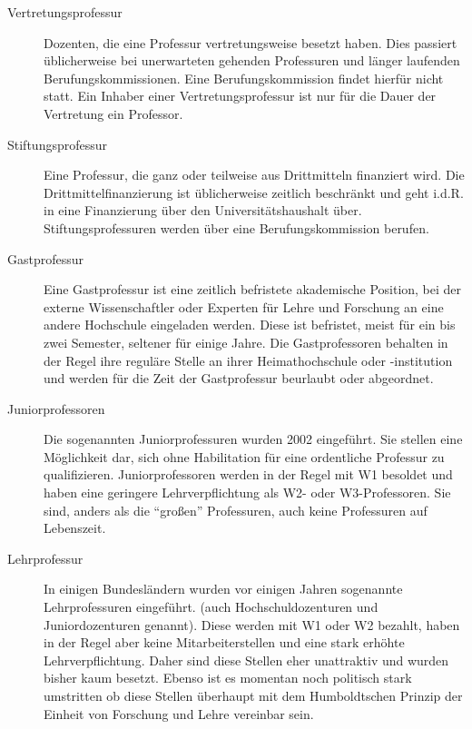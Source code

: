 \begin{description}
    \item [Vertretungsprofessur]
          Dozenten, die eine Professur vertretungsweise besetzt haben. Dies passiert üblicherweise bei unerwarteten gehenden Professuren und länger laufenden Berufungskommissionen.
          Eine Berufungskommission findet hierfür nicht statt.
          Ein Inhaber einer Vertretungsprofessur ist nur für die Dauer der Vertretung ein Professor.

    \item [Stiftungsprofessur]
          Eine Professur, die ganz oder teilweise aus Drittmitteln finanziert wird. Die Drittmittelfinanzierung ist üblicherweise zeitlich beschränkt und geht i.d.R. in eine Finanzierung über den Universitätshaushalt über.
          Stiftungsprofessuren werden über eine Berufungskommission berufen.

    \item [Gastprofessur]
          Eine Gastprofessur ist eine zeitlich befristete akademische Position, bei der externe Wissenschaftler oder Experten für Lehre und Forschung an eine andere Hochschule eingeladen werden. 
          Diese ist befristet, meist für ein bis zwei Semester, seltener für einige Jahre. Die Gastprofessoren behalten in der Regel ihre reguläre Stelle an ihrer Heimathochschule oder -institution und werden für die Zeit der Gastprofessur beurlaubt oder abgeordnet.

    \item [Juniorprofessoren]
          Die sogenannten Juniorprofessuren wurden 2002 eingeführt. Sie stellen eine Möglichkeit dar, sich
          ohne Habilitation für eine ordentliche Professur zu qualifizieren. Juniorprofessoren werden in der Regel mit W1
          besoldet und haben eine geringere Lehrverpflichtung als W2- oder W3-Professoren. Sie sind, anders als die "`großen"'
          Professuren, auch keine Professuren auf Lebenszeit.

    \item [Lehrprofessur]
          In einigen Bundesländern wurden vor einigen Jahren sogenannte Lehrprofessuren eingeführt.
          (auch Hochschuldozenturen und Juniordozenturen genannt). Diese werden mit W1 oder W2 bezahlt, haben
          in der Regel aber keine Mitarbeiterstellen und eine stark er\-höh\-te Lehrverpflichtung. Daher
          sind diese Stellen eher unattraktiv und wurden bisher kaum besetzt. Ebenso ist es momentan noch
          politisch stark umstritten ob diese Stellen überhaupt mit dem Humboldtschen Prinzip der Einheit
          von Forschung und Lehre vereinbar sein.


\end{description}
